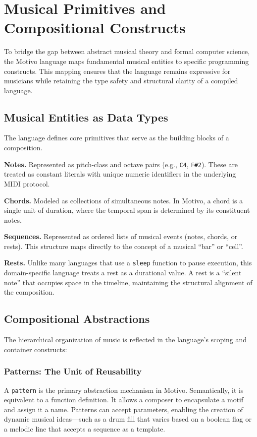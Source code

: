 \section{Musical Primitives and Compositional Constructs}\label{sec:musical-primitives}

To bridge the gap between abstract musical theory and formal computer science, the Motivo language maps
fundamental musical
entities to specific programming constructs.
This mapping ensures that the language remains expressive for musicians while retaining the type safety and structural
clarity of a compiled language.

\subsection{Musical Entities as Data Types}\label{detail-subsec:musical-entities-as-data-types}

The language defines core primitives that serve as the building blocks of a composition.

\noindent \textbf{Notes.} Represented as pitch-class and octave pairs (e.g., \texttt{C4}, \texttt{F\#2}).
These are treated as constant literals with unique numeric identifiers in the underlying MIDI protocol.

\noindent \textbf{Chords.} Modeled as collections of simultaneous notes.
In Motivo, a chord is a single unit of duration, where the temporal span is determined by its constituent notes.

\noindent \textbf{Sequences.} Represented as ordered lists of musical events (notes, chords, or rests).
This structure maps directly to the concept of a musical ``bar'' or ``cell''.

\noindent \textbf{Rests.} Unlike many languages that use a \texttt{sleep} function to pause execution, this
domain-specific language treats a
rest as a durational value.
A rest is a ``silent note'' that occupies space in the timeline, maintaining the structural alignment of the
composition.

\subsection{Compositional Abstractions}\label{detail-subsec:compositional-abstractions}

The hierarchical organization of music is reflected in the language's scoping and container constructs:

\subsubsection{Patterns: The Unit of Reusability}
A \texttt{pattern} is the primary abstraction mechanism in Motivo\@.
Semantically, it is equivalent to a function definition.
It allows a composer to encapsulate a motif and assign it a name.
Patterns can accept parameters, enabling the creation of dynamic musical ideas---such as a drum fill that
varies based on
a boolean flag or a melodic line that accepts a sequence as a template.

